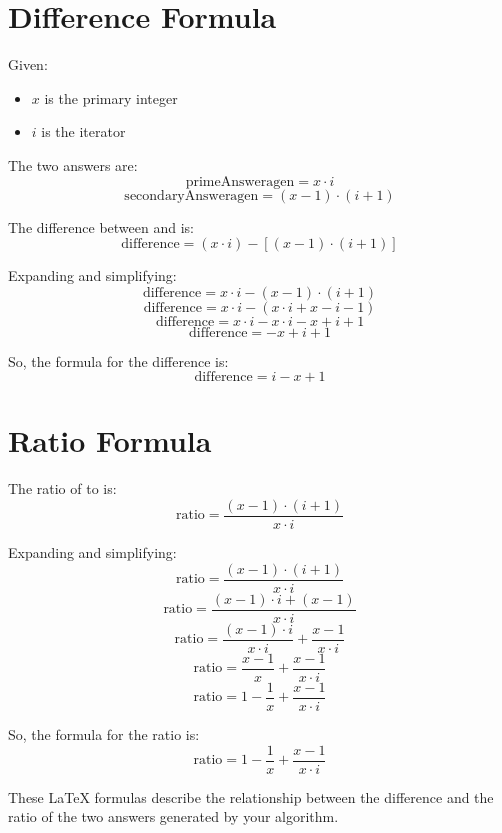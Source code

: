 \documentclass{article}
\begin{document}
\section*{Difference Formula}

Given:
\begin{itemize}
    \item \( x \) is the primary integer
    \item \( i \) is the iterator
\end{itemize}

The two answers are:
\[
\text{primeAnsweragen} = x \cdot i
\]
\[
\text{secondaryAnsweragen} = (x - 1) \cdot (i + 1)
\]

The difference between  and  is:
\[
\text{difference} = (x \cdot i) - [(x - 1) \cdot (i + 1)]
\]

Expanding and simplifying:
\[
\text{difference} = x \cdot i - (x - 1) \cdot (i + 1)
\]
\[
\text{difference} = x \cdot i - (x \cdot i + x - i - 1)
\]
\[
\text{difference} = x \cdot i - x \cdot i - x + i + 1
\]
\[
\text{difference} = -x + i + 1
\]

So, the formula for the difference is:
\[
\text{difference} = i - x + 1
\]

\section*{Ratio Formula}

The ratio of  to  is:
\[
\text{ratio} = \frac{(x - 1) \cdot (i + 1)}{x \cdot i}
\]

Expanding and simplifying:
\[
\text{ratio} = \frac{(x - 1) \cdot (i + 1)}{x \cdot i}
\]
\[
\text{ratio} = \frac{(x - 1) \cdot i + (x - 1)}{x \cdot i}
\]
\[
\text{ratio} = \frac{(x - 1) \cdot i}{x \cdot i} + \frac{x - 1}{x \cdot i}
\]
\[
\text{ratio} = \frac{x - 1}{x} + \frac{x - 1}{x \cdot i}
\]
\[
\text{ratio} = 1 - \frac{1}{x} + \frac{x - 1}{x \cdot i}
\]

So, the formula for the ratio is:
\[
\text{ratio} = 1 - \frac{1}{x} + \frac{x - 1}{x \cdot i}
\]

These LaTeX formulas describe the relationship between the difference and the ratio of the two answers generated by your algorithm.
\end{document}
